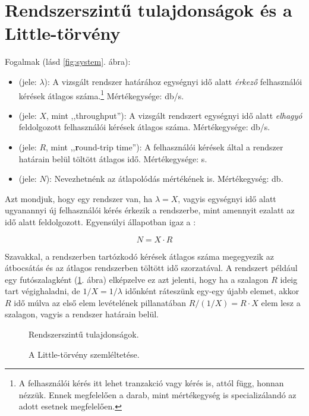 \section{Rendszerszintű tulajdonságok és a Little-törvény}

\begin{definicio}
	Fogalmak (lásd \ref{fig:system}. ábra):

	\begin{itemize}
		\item {} (jele: $\lambda$): A vizsgált rendszer határához egységnyi idő alatt \emph{érkező} felhasználói kérések átlagos száma.\footnote{A felhasználói kérés itt lehet tranzakció vagy kérés is, attól függ, honnan nézzük. Ennek megfelelően a darab, mint mértékegység is specializálandó az adott esetnek megfelelően.} Mértékegysége: db/s.
		\item {} (jele: $X$, mint ,,throughput''): A vizsgált rendszert egységnyi idő alatt \emph{elhagyó} feldolgozott felhasználói kérések átlagos száma. Mértékegysége: db/s.
		\item {} (jele: $R$, mint ,,\textbf{r}ound-trip time''): A felhasználói kérések által a rendszer határain belül töltött átlagos idő. Mértékegysége: s.
		\item {} (jele: $N$): Nevezhetnénk az átlapolódás mértékének is. Mértékegység: db.
	\end{itemize}
\end{definicio}

Azt mondjuk, hogy egy rendszer  van, ha $\lambda = X$, vagyis egységnyi idő alatt ugyanannyi új felhasználói kérés érkezik a rendszerbe, mint amennyit ezalatt az idő alatt feldolgozott. Egyensúlyi állapotban igaz a :

$$N = X \cdot R$$

Szavakkal, a rendszerben tartózkodó kérések átlagos száma megegyezik az átbocsátás és az átlagos rendszerben töltött idő szorzatával. A rendszert például egy futószalagként (\ref{fig:little}. ábra) elképzelve ez azt jelenti, hogy ha a szalagon $R$ ideig tart végighaladni, de $1/X = 1/\lambda$ időnként ráteszünk egy-egy újabb elemet, akkor $R$ idő múlva az első elem levételének pillanatában $R/(1/X) = R \cdot X$ elem lesz a szalagon, vagyis a rendszer határain belül.

\begin{figure}[H]
	\centering
	\begin{minipage}{7cm}
		\centering
		\def\svgwidth{6cm}
		
		\caption{Rendszerszintű tulajdonságok.}
		\label{fig:system}
	\end{minipage}
	\hspace{1cm}
	\begin{minipage}{7cm}
		\centering
		
		\caption{A Little-törvény szemléltetése.}
		\label{fig:little}
	\end{minipage}
\end{figure}

